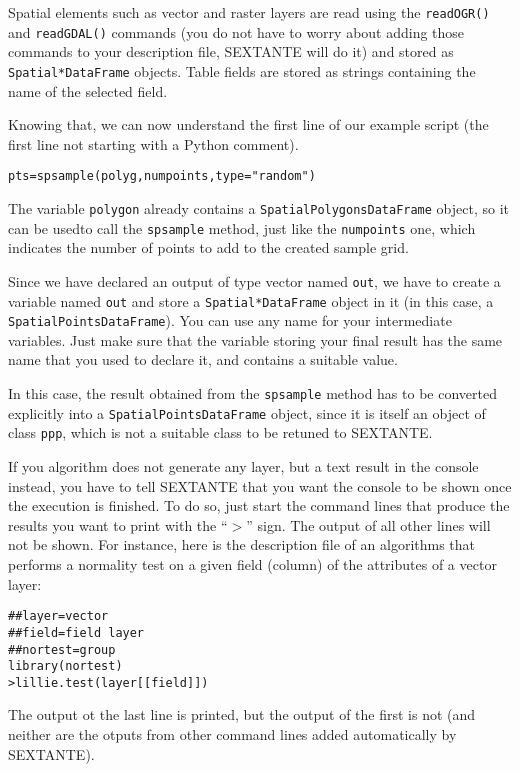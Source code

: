 Spatial elements such as vector and raster layers are read using the \texttt{readOGR()} and \texttt{readGDAL()} commands (you do not have to worry about adding those commands to your description file, SEXTANTE will do it) and stored as \texttt{Spatial*DataFrame} objects. Table fields are stored as strings containing the name of the selected field.

Knowing that, we can now understand the first line of our example script (the first line not starting with a Python comment).


\begin{verbatim}
pts=spsample(polyg,numpoints,type="random")
\end{verbatim}

The variable \texttt{polygon} already contains a \texttt{SpatialPolygonsDataFrame} object, so it can be usedto call the \texttt{spsample} method, just like the \texttt{numpoints} one, which indicates the number of points to add to the created sample grid.

Since we have declared an output of type vector named \texttt{out}, we have to create a variable named \texttt{out} and store a \texttt{Spatial*DataFrame} object in it (in this case, a \texttt{SpatialPointsDataFrame}). You can use any name for your intermediate variables. Just make sure that the variable storing your final result has the same name that you used to declare it, and contains a suitable value.

In this case, the result obtained from the \texttt{spsample} method has to be converted explicitly into a \texttt{SpatialPointsDataFrame} object, since it is itself an object of class \texttt{ppp}, which is not a suitable class to be retuned to SEXTANTE.

If you algorithm does not generate any layer, but a text result in the console instead, you have to tell SEXTANTE that you want the console to be shown once the execution is finished. To do so, just start the command lines that produce the results you want to print with the ``$>$'' sign. The output of all other lines will not be shown. For instance, here is the description file of an algorithms that performs a normality test on a given field (column) of the attributes of a vector layer:

\begin{verbatim}
##layer=vector
##field=field layer
##nortest=group
library(nortest)
>lillie.test(layer[[field]]) 	
\end{verbatim}

The output ot the last line is printed, but the output of the first is not (and neither are the otputs from other command lines added automatically by SEXTANTE).

